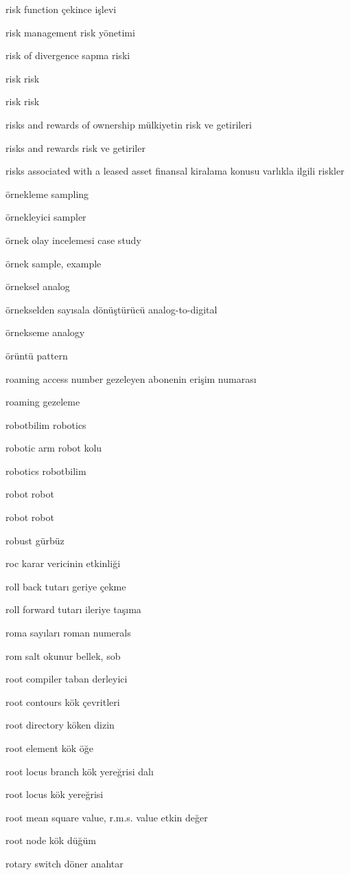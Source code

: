 \documentclass[12pt,fleqn]{article}\usepackage{../../common}
\begin{document}
risk function çekince işlevi

risk management risk yönetimi

risk of divergence sapma riski

risk risk

risk risk

risks and rewards of ownership mülkiyetin risk ve getirileri

risks and rewards risk ve getiriler

risks associated with a leased asset finansal kiralama konusu varlıkla ilgili riskler

örnekleme sampling

örnekleyici sampler

örnek olay incelemesi case study

örnek sample, example

örneksel analog

örnekselden sayısala dönüştürücü analog-to-digital

örnekseme analogy

örüntü pattern

roaming access number gezeleyen abonenin erişim numarası

roaming gezeleme

robotbilim robotics

robotic arm robot kolu

robotics robotbilim

robot robot

robot robot

robust gürbüz

roc karar vericinin etkinliği

roll back tutarı geriye çekme

roll forward tutarı ileriye taşıma

roma sayıları roman numerals

rom salt okunur bellek, sob

root compiler taban derleyici

root contours kök çevritleri

root directory köken dizin

root element kök öğe

root locus branch kök yereğrisi dalı

root locus kök yereğrisi

root mean square value, r.m.s. value etkin değer

root node kök düğüm

rotary switch döner anahtar
\end{document}
